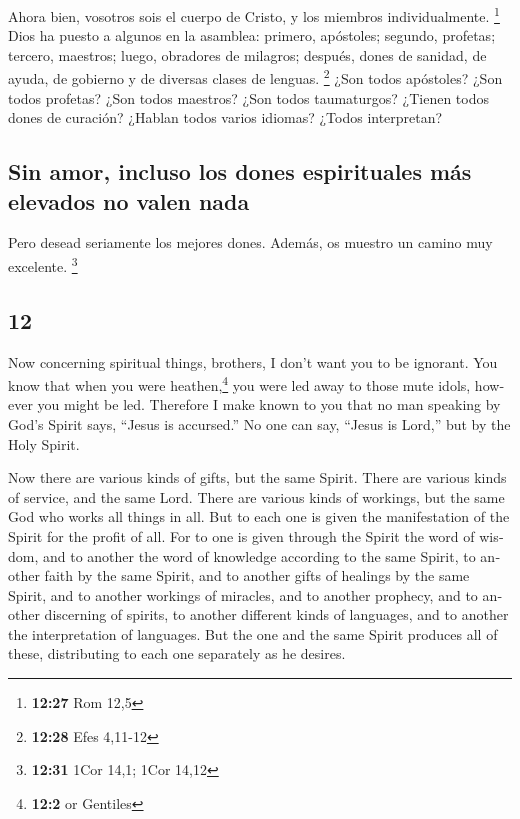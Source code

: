 \begin{paracol}{2}
 Ahora bien, vosotros sois el cuerpo de Cristo, y los
miembros individualmente. \footnote{\textbf{12:27} Rom 12,5}
 Dios ha puesto a algunos en la asamblea: primero,
apóstoles; segundo, profetas; tercero, maestros; luego, obradores de
milagros; después, dones de sanidad, de ayuda, de gobierno y de diversas
clases de lenguas. \footnote{\textbf{12:28} Efes 4,11-12}
 ¿Son todos apóstoles? ¿Son todos profetas? ¿Son todos
maestros? ¿Son todos taumaturgos?  ¿Tienen todos dones de
curación? ¿Hablan todos varios idiomas? ¿Todos interpretan?

\hypertarget{sin-amor-incluso-los-dones-espirituales-muxe1s-elevados-no-valen-nada}{%
\subsection{Sin amor, incluso los dones espirituales más elevados no
valen
nada}\label{sin-amor-incluso-los-dones-espirituales-muxe1s-elevados-no-valen-nada}}

 Pero desead seriamente los mejores dones. Además, os
muestro un camino muy excelente. \footnote{\textbf{12:31} 1Cor 14,1;
  1Cor 14,12}

\switchcolumn
\begin{otherlanguage}{english}

\hypertarget{section-23}{%
\section{12}\label{section-23}}

 Now concerning spiritual things, brothers, I don't want
you to be ignorant.  You know that when you were
heathen,\footnote{\textbf{12:2} or Gentiles} you were led away to those
mute idols, however you might be led.  Therefore I make
known to you that no man speaking by God's Spirit says, ``Jesus is
accursed.'' No one can say, ``Jesus is Lord,'' but by the Holy Spirit.

 Now there are various kinds of gifts, but the same
Spirit.  There are various kinds of service, and the same
Lord.  There are various kinds of workings, but the same
God who works all things in all.  But to each one is given
the manifestation of the Spirit for the profit of all. 
For to one is given through the Spirit the word of wisdom, and to
another the word of knowledge according to the same Spirit,
 to another faith by the same Spirit, and to another gifts
of healings by the same Spirit,  and to another workings
of miracles, and to another prophecy, and to another discerning of
spirits, to another different kinds of languages, and to another the
interpretation of languages.  But the one and the same
Spirit produces all of these, distributing to each one separately as he
desires.


\end{otherlanguage}
\end{paracol}
